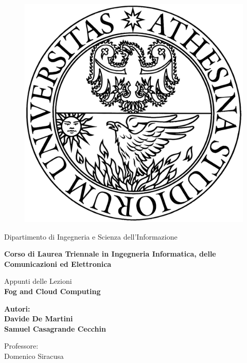 \begin{titlepage} %
\begin{figure}[t] %
    \centering\includegraphics[scale=0.1]{images/unitn.png}
\end{figure}
\vspace{20mm}

\begin{Large}
 \begin{center}
	Dipartimento di Ingegneria e Scienza dell'Informazione
	
	\textbf{Corso di Laurea Triennale in Ingegneria Informatica, delle Comunicazioni ed Elettronica}
	
	\vspace{5mm}

    \hrulefill
    
    \vspace{25mm}
	
    {\LARGE{Appunti delle Lezioni}}\\
	\vspace{10mm}
	{\huge{\bf Fog and Cloud Computing}}\\
\end{center}
\end{Large}


\vspace{36mm}
\begin{minipage}[t]{0.47\textwidth}
	{\large{\bf Autori:\\Davide De Martini\\ Samuel Casagrande Cecchin}}
\end{minipage}
\hfill
\begin{minipage}[t]{0.47\textwidth}\raggedleft
	{\large{Professore: \\Domenico Siracusa}}
\end{minipage}


\end{titlepage}
